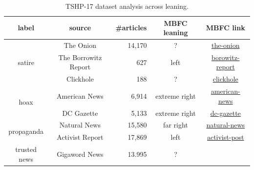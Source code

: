 \begin{table}[!htbp]
    \centering
    \begin{tabular}{c|c|r|c|c}
        label & source & \#articles & MBFC leaning & MBFC link \\
        \hline
        \multirow{3}{*}{satire} & The Onion & 14,170 & ? & \href{https://mediabiasfactcheck.com/the-onion/}{the-onion} \\
                                & The Borrowitz Report & 627 & left & \href{https://mediabiasfactcheck.com/borowitz-report/}{borowitz-report} \\
                                & Clickhole & 188 & ? & \href{https://mediabiasfactcheck.com/clickhole/}{clickhole} \\
        \hline
        \multirow{2}{*}{hoax} & American News & 6,914 & extreme right & \href{https://mediabiasfactcheck.com/anews-24-com-american-news/}{american-news} \\
                                & DC Gazette & 5,133 & extreme right & \href{https://mediabiasfactcheck.com/dc-gazette/}{dc-gazette} \\
        \hline
        \multirow{2}{*}{propaganda} & Natural News & 15,580 & far right & \href{https://mediabiasfactcheck.com/natural-news/}{natural-news} \\
                                & Activist Report & 17,869 & left & \href{https://mediabiasfactcheck.com/activist-post/}{activist-post} \\
        \hline
        trusted news & Gigaword News & 13.995 & ? & 
    \end{tabular}
    \caption{TSHP-17 dataset analysis across leaning.}
    \label{tab:tshp17_across_leaning}
\end{table}




